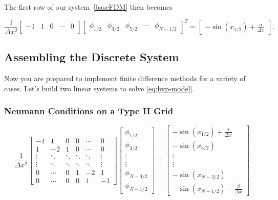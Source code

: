\noindent The first row of our system~\eqref{baseFDM} then becomes

\begin{equation}
    \frac{1}{\Delta x^2}
    \begin{bmatrix}
        -1& 1 & 0 & \cdots & 0\\
    \end{bmatrix}
    \begin{bmatrix}
        \phi_{1/2} & \phi_{3/2} & \phi_{5/2} &  \cdots  & \phi_{N - 1/2}
    \end{bmatrix}^T
    =
    \begin{bmatrix}
        -\sin(x_{1/2}) + \frac{\alpha}{\Delta x}
    \end{bmatrix}. \label{neuTypeII}
\end{equation}


\subsection{Assembling the Discrete System}
\label{sec:assembly}


Now you are prepared to implement finite difference methods for a variety of cases. Let's build two linear systems to solve \eqref{eq:bvp-model}. 

\subsubsection*{Neumann Conditions on a Type II Grid}
\begin{equation}
    \frac{1}{\Delta x^2}
    \begin{bmatrix}
        -1 & 1 & 0& 0& \cdots & 0\\
        1 & -2 & 1 &0 &\cdots & 0 \\
         \vdots & \ddots & \ddots & \ddots & \ddots & \vdots\\
          \vdots & \ddots & \ddots & \ddots & \ddots & \vdots\\
          0&\cdots & 0 & 1 & -2 & 1 \\
          0&\cdots & 0 & 0& 1 & -1
    \end{bmatrix}
    \begin{bmatrix}
        \phi_{1/2} \\ \phi_{3/2} \\ \vdots \\ \vdots \\ \phi_{N-3/2} \\ \phi_{N-1/2}
    \end{bmatrix}
    =
    \begin{bmatrix}
        -\sin(x_{1/2}) + \frac{\alpha}{\Delta x}  \\
        -\sin(x_{3/2}) \\
        \vdots \\
                \vdots \\
        -\sin(x_{N-3/2}) \\
        -\sin(x_{N-1/2}) - \frac{\beta}{\Delta x}
    \end{bmatrix}.
    \label{NuemannTypeIISolver}
\end{equation}


